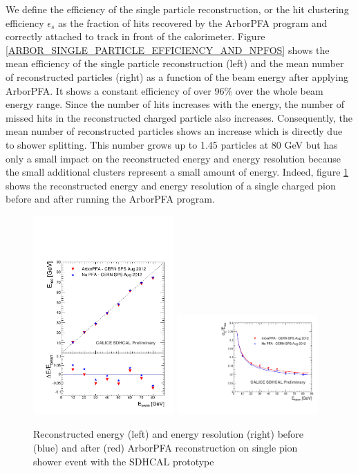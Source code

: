 \documentclass[cits]{JINST}
\begin{document}
We define the efficiency of the single particle reconstruction, or the hit clustering efficiency $\epsilon_s$ as the fraction of hits recovered by the ArborPFA program and correctly attached to track in front of the calorimeter. Figure \ref{ARBOR_SINGLE_PARTICLE_EFFICIENCY_AND_NPFOS} shows the mean efficiency of the single particle reconstruction (left) and the mean number of reconstructed particles (right) as a function of the beam energy after applying ArborPFA. It shows a constant efficiency of over 96\% over the whole beam energy range. Since the number of hits increases with the energy, the number of missed hits in the reconstructed charged particle also increases. Consequently, the mean number of reconstructed particles shows an increase which is directly due to shower splitting. This number grows up to 1.45 particles at 80 GeV but has only a small impact on the reconstructed energy and energy resolution because the small additional clusters represent a small amount of energy. Indeed, figure \ref{ARBOR_SINGLE_PARTICLE_EREC_AND_ERESOL} shows the reconstructed energy and energy resolution of a single charged pion before and after running the ArborPFA program. 

\begin{figure}[!h]
  \begin{center}
    \includegraphics[width=0.48\textwidth]{plots/SingleParticle_ERec.pdf}
    \includegraphics[width=0.48\textwidth]{plots/SingleParticle_EResol.pdf} \\
  \end{center}
  \caption{\label{ARBOR_SINGLE_PARTICLE_EREC_AND_ERESOL} Reconstructed energy (left) and energy resolution (right) before (blue) and after (red) ArborPFA reconstruction on single pion shower event with the SDHCAL prototype}
\end{figure}
\end{document}
